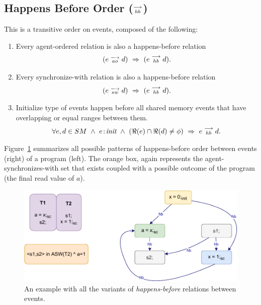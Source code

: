         
    \subsection{Happens Before Order ($\stackrel{\longrightarrow}{_{hb}}$)}
        This is a transitive order on events, composed of the following:
        \begin{enumerate}
            \item Every agent-ordered relation is also a happens-before relation 
                \begin{align*}
                    (\reln{e}{ao}{d}) \ \Rightarrow{} \ (\reln{e}{hb}{d}).    
                \end{align*}
                
            \item Every synchronize-with relation is also a happens-before relation 
                \begin{align*}
                    (\reln{e}{sw}{d}) \ \Rightarrow{} \ (\reln{e}{hb}{d}).    
                \end{align*}
                 
            \item Initialize type of events happen before all shared memory events that have overlapping or equal ranges between them. 
                \begin{align*}
                    \forall e,d \in SM \ \wedge \ 
                    \et{e}{init} \ \wedge \ 
                    (\Re(e) \cap \Re(d) \neq \phi)
                    \ \Rightarrow{} \ 
                    \reln{e}{hb}{d}.
                \end{align*}          
        \end{enumerate}
        Figure~\ref{model:happens-before} summarizes all possible patterns of happens-before order between events (right) of a program (left).
        The orange box, again represents the agent-synchronizes-with set that exists coupled with a possible outcome of the program (the final read value of $a$).
        \begin{figure}[H]
            \centering
            \includegraphics[scale=0.7]{3.ECMAScriptMemoryModel/Happens-before.pdf}
            \caption{An example with all the variants of \textit{happens-before} relations between events.}
            \label{model:happens-before}
        \end{figure}
    
